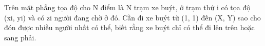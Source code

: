 Trên mặt phẳng tọa độ cho N điểm là N trạm xe buýt, ở trạm thứ i có tọa độ (xi, yi) và có zi người đang chờ ở đó. Cần đi xe buýt từ (1, 1) đến (X, Y) sao cho đón được nhiều người nhất có thể, biết rằng xe buýt chỉ có thể đi lên trên hoặc sang phải.